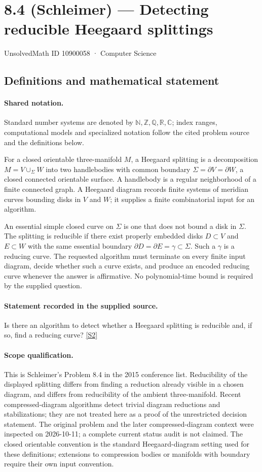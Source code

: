 \documentclass[11pt]{article}
\newcommand{\sref}[2]{\hyperlink{source:#1:#2}{[S#2]}}
\begin{document}
\setcounter{section}{10900057}
\section{8.4 (Schleimer) — Detecting reducible Heegaard splittings}\label{10900058}
{\small\sffamily UnsolvedMath ID 10900058 · Computer Science}
\subsection{Definitions and mathematical statement}

\paragraph{Shared notation.}Standard number systems are denoted by $\mathbb N,\mathbb Z,\mathbb Q,\mathbb R,\mathbb C$; index ranges, computational models and specialized notation follow the cited problem source and the definitions below.


For a closed orientable three-manifold $M$, a Heegaard splitting is a decomposition $M=V\cup_\Sigma W$ into two handlebodies with common boundary $\Sigma=\partial V=\partial W$, a closed connected orientable surface. A handlebody is a regular neighborhood of a finite connected graph. A Heegaard diagram records finite systems of meridian curves bounding disks in $V$ and $W$; it supplies a finite combinatorial input for an algorithm.

An essential simple closed curve on $\Sigma$ is one that does not bound a disk in $\Sigma$. The splitting is reducible if there exist properly embedded disks $D\subset V$ and $E\subset W$ with the same essential boundary $\partial D=\partial E=\gamma\subset\Sigma$. Such a $\gamma$ is a reducing curve. The requested algorithm must terminate on every finite input diagram, decide whether such a curve exists, and produce an encoded reducing curve whenever the answer is affirmative. No polynomial-time bound is required by the supplied question.
\paragraph{Statement recorded in the supplied source.}
Is there an algorithm to detect whether a Heegaard splitting is reducible and, if so, find a reducing curve? \sref{10900058}{2}
\paragraph{Scope qualification.}
This is Schleimer's Problem 8.4 in the 2015 conference list. Reducibility of the displayed splitting differs from finding a reduction already visible in a chosen diagram, and differs from reducibility of the ambient three-manifold. Recent compressed-diagram algorithms detect trivial diagram reductions and stabilizations; they are not treated here as a proof of the unrestricted decision statement. The original problem and the later compressed-diagram context were inspected on 2026-10-11; a complete current status audit is not claimed. The closed orientable convention is the standard Heegaard-diagram setting used for these definitions; extensions to compression bodies or manifolds with boundary require their own input convention.
\end{document}
